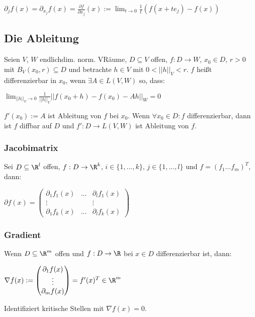 $\partial_j f(x) = \partial_{x_j} f(x) = \frac{\partial f}{\partial x_j}(x) := \displaystyle\lim_{t \to 0} \frac{1}{t}(f(x+te_j)-f(x))$

\subsection*{Die Ableitung}

Seien $V$, $W$ endlichdim. norm. VRäume, $D \subseteq V$ offen, $f: D \rightarrow W$, $x_0 \in D$, $r > 0$ mit $B_V(x_0, r) \subseteq D$ und betrachte $h \in V$ mit $0 < ||h||_V < r$. $f$ heißt differenzierbar in $x_0$, wenn $\exists A \in L(V, W)$ so, dass:

$\displaystyle\lim_{||h||_V \to 0} \frac{1}{||h||_V}||f(x_0 + h) - f(x_0) - Ah||_W = 0$

$f'(x_0) := A$ ist Ableitung von $f$ bei $x_0$. Wenn $\forall x_0 \in D : f $ differenzierbar, dann ist $f$ diffbar auf $D$ und $f' : D \rightarrow L(V,W)$ ist Ableitung von $f$.

\subsubsection*{Jacobimatrix}

Sei $D \subseteq \R^l$ offen, $f : D \rightarrow \R^k$, $i \in \{1, ..., k\}$, $j \in \{1, ..., l\}$ und $f = (f_1 \hdots f_m)^T$, dann:

$\partial f(x) = \begin{pmatrix} \partial_1 f_1(x) & \hdots & \partial_l f_1(x) \\ \vdots & & \vdots \\ \partial_1 f_k(x) & \hdots & \partial_l f_k(x) \end{pmatrix}$

\subsubsection*{Gradient}

Wenn $D \subseteq \R^m$ offen und $f : D \rightarrow \R$ bei $x \in D$ differenzierbar ist, dann:

$\nabla f(x) := \begin{pmatrix} \partial_1 f(x) \\ \vdots \\ \partial_m f(x) \end{pmatrix} = f'(x)^T \in \R^m$

Identifiziert kritische Stellen mit $\nabla f(x) = 0$.

